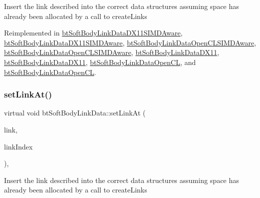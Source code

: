Insert the link described into the correct data structures assuming space has already been allocated by a call to create\+Links 

Reimplemented in \hyperlink{classbtSoftBodyLinkDataDX11SIMDAware_aa8139528d8d1c83643b46e2e3a8a6b35}{bt\+Soft\+Body\+Link\+Data\+D\+X11\+S\+I\+M\+D\+Aware}, \hyperlink{classbtSoftBodyLinkDataDX11SIMDAware_ae43f275f9bc20e56ace8b3223b263ce4}{bt\+Soft\+Body\+Link\+Data\+D\+X11\+S\+I\+M\+D\+Aware}, \hyperlink{classbtSoftBodyLinkDataOpenCLSIMDAware_a9a1482f91ff8105f41a1f991e183e120}{bt\+Soft\+Body\+Link\+Data\+Open\+C\+L\+S\+I\+M\+D\+Aware}, \hyperlink{classbtSoftBodyLinkDataOpenCLSIMDAware_a02bc02902c70fab9bc96d6d8adcc69b5}{bt\+Soft\+Body\+Link\+Data\+Open\+C\+L\+S\+I\+M\+D\+Aware}, \hyperlink{classbtSoftBodyLinkDataDX11_a4ceea7a93543a6a54719e1d77c21cae1}{bt\+Soft\+Body\+Link\+Data\+D\+X11}, \hyperlink{classbtSoftBodyLinkDataDX11_a33aa1666f79ec3e6b065844a02930faf}{bt\+Soft\+Body\+Link\+Data\+D\+X11}, \hyperlink{classbtSoftBodyLinkDataOpenCL_abef476a18a102fffd4dbb73ca2cfb9a4}{bt\+Soft\+Body\+Link\+Data\+Open\+CL}, and \hyperlink{classbtSoftBodyLinkDataOpenCL_a4602606fdbcaa6cd2a976c71f7582398}{bt\+Soft\+Body\+Link\+Data\+Open\+CL}.

\mbox{\label{classbtSoftBodyLinkData_a44f200dcb878405cebf3704dc7a8b8cd}} 
\subsubsection{\texorpdfstring{set\+Link\+At()}{setLinkAt()}\hspace{0.1cm}{\footnotesize\ttfamily [2/2]}}
{\footnotesize\ttfamily virtual void bt\+Soft\+Body\+Link\+Data\+::set\+Link\+At (\begin{DoxyParamCaption}\item[{const \hyperlink{classbtSoftBodyLinkData_1_1LinkDescription}{Link\+Description} \&}]{link,  }\item[{int}]{link\+Index }\end{DoxyParamCaption})\hspace{0.3cm}{\ttfamily [inline]}, {\ttfamily [virtual]}}

Insert the link described into the correct data structures assuming space has already been allocated by a call to create\+Links 

